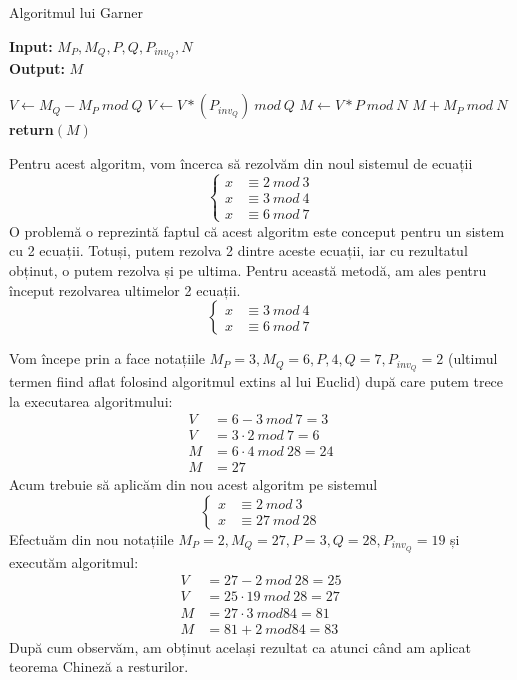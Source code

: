 \documentclass[12pt, oneside]{book}
\begin{document}
\begin{algorithm}[H]
		   \caption{Algoritmul lui Garner}
		   \textbf{Input:} $M_P,M_Q,P,Q,P_{inv_Q},N $  \\
		   \textbf{Output:} $M$
		   \begin{algorithmic}
		   \State $V \gets M_Q - M_P \ mod \ Q$
		   \State $V \gets V * (P_{inv_Q}) \ mod \ Q$
		   \State $M \gets V * P \ mod \ N$
		   \State $M+M_P \ mod \ N$
		   \State \textbf{return$(M)$}	 
		   \end{algorithmic}
		   \end{algorithm}
	  Pentru acest algoritm, vom încerca să rezolvăm din noul sistemul de ecuații
	  \[
\begin{cases}
x &\equiv 2 \ mod \ 3  \\
x &\equiv 3 \ mod \ 4  \\
x &\equiv 6 \ mod \ 7
\end{cases}
\]	
O problemă o reprezintă faptul că acest algoritm este conceput pentru un sistem cu 2 ecuații. Totuși, putem rezolva 2 dintre aceste ecuații, iar cu rezultatul obținut, o putem rezolva și pe ultima. Pentru această metodă, am ales pentru început rezolvarea ultimelor 2 ecuații. 
	  \[
\begin{cases}
x &\equiv 3 \ mod \ 4  \\
x &\equiv 6 \ mod \ 7
\end{cases}
\]

Vom începe prin a face notațiile $M_P=3,M_Q=6,P,4,Q=7,P_{inv_Q}=2$ (ultimul termen fiind aflat folosind algoritmul extins al lui Euclid) după care putem trece la executarea algoritmului:
\begin{align*}
V&=6-3 \ mod \ 7 =3 \\
V&= 3 \cdot 2 \ mod \ 7 = 6 \\
M&= 6 \cdot 4 \ mod \ 28 =24 \\
M&=27
\end{align*}
Acum trebuie să aplicăm din nou acest algoritm pe sistemul
	  \[
\begin{cases}
x &\equiv 2 \ mod \ 3  \\
x &\equiv 27 \ mod \ 28  
\end{cases}
\]
Efectuăm din nou notațiile $M_P=2,M_Q=27,P=3,Q=28,P_{inv_Q}=19$ și executăm algoritmul:
\begin{align*}
V&=27-2 \ mod \ 28 = 25 \\
V&=25 \cdot 19 \ mod \ 28 = 27 \\
M&=27 \cdot 3 \ mod 84 = 81 \\
M&=81+2 \ mod 84 = 83
\end{align*}
După cum observăm, am obținut același rezultat ca atunci când am aplicat teorema Chineză a resturilor.
	  
\end{document}
